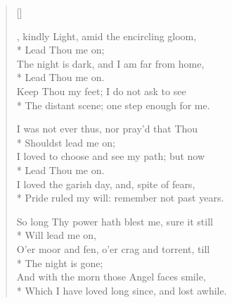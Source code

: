 \newHymn


\begin{verse}[\versewidth]
\begin{patverse}
, kindly Light, amid the encircling gloom,\\*
Lead Thou me on;\\
The night is dark, and I am far from home,\\*
Lead Thou me on.\\
Keep Thou my feet; I do not ask to see\\*
The distant scene; one step enough for me.
\end{patverse}

\begin{patverse}
I was not ever thus, nor pray'd that Thou\\*
Shouldst lead me on;\\
I loved to choose and see my path; but now\\*
Lead Thou me on.\\
I loved the garish day, and, spite of fears,\\*
Pride ruled my will: remember not past years.
\end{patverse}


\begin{patverse}
So long Thy power hath blest me, sure it still\\*
Will lead me on,\\
O'er moor and fen, o'er crag and torrent, till\\*
The night is gone;\\
And with the morn those Angel faces smile,\\*
Which I have loved long since, and lost awhile.
\end{patverse}


\end{verse}


